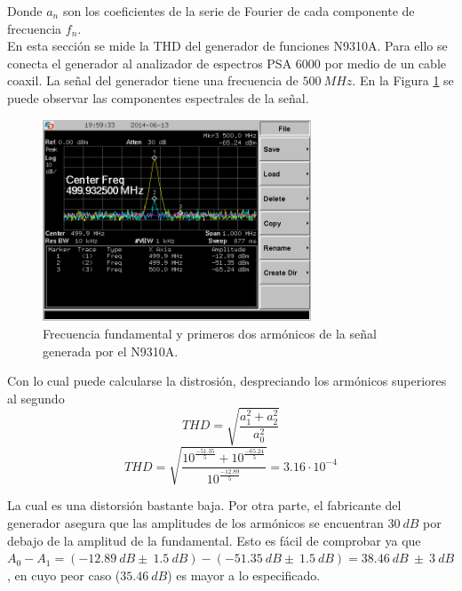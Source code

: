 \documentclass[a4paper,10pt]{article}
\begin{document}
		\indent Donde $a_n$ son los coeficientes de la serie de Fourier de cada 
		componente de frecuencia $f_n$. \\
		\indent En esta secci\'on se mide la THD del generador de funciones 
		N9310A. Para ello se conecta el generador al analizador de espectros PSA
		6000 por medio de un cable coaxil. La se\~nal del generador tiene una 
		frecuencia de $500~MHz$. En la Figura \ref{THD} se puede observar las 
		componentes espectrales de la se\~nal.
		
		\begin{figure}[!htb]
				\centering
				\includegraphics[width=8cm]
				{Imagenes/SCREN445.png}
				\caption{Frecuencia fundamental y primeros dos arm\'onicos de la
				se\~nal generada por el N9310A.}
				\label{THD} 
		\end{figure}
		
		\indent Con lo cual puede calcularse la distrosi\'on, despreciando los 
		arm\'onicos superiores al segundo
		$$THD=\sqrt{\frac{a^2_1+a^2_2}{a^2_0}}$$
		$$THD=\sqrt{\frac{10^{\frac{-51.35}{5}}+10^{\frac{-65.24}{5}}}{10^{
		\frac{-12.89}{5}}}}=3.16\cdot10^{-4}$$
		
		
		\indent La cual es una distorsi\'on bastante baja. Por otra parte, el 
		fabricante del generador asegura que las amplitudes de los arm\'onicos 
		se encuentran $30~dB$ por debajo de la amplitud de la fundamental. Esto 
		es f\'acil de comprobar ya que 
		$A_0-A_1=(-12.89~dB\pm~1.5~dB)-(-51.35~dB\pm~1.5~dB)=38.46~dB~\pm~3~dB$,
		en cuyo peor caso ($35.46~dB$) es mayor a lo especificado.
		
\end{document}
